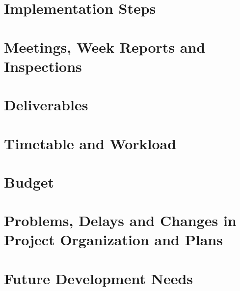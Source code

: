 \section{Implementation Steps}

\section{Meetings, Week Reports and Inspections}

\section{Deliverables}

\section{Timetable and Workload}

\section{Budget}

\section{Problems, Delays and Changes in Project Organization and Plans}

\section{Future Development Needs}




